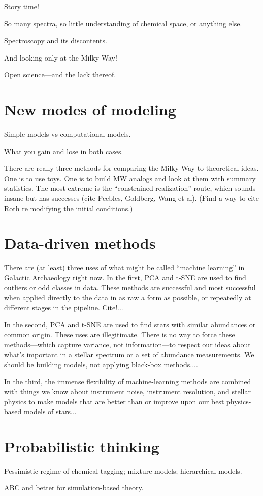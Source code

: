 \documentclass[11pt, letterpaper]{article}
\begin{document}
Story time!

So many spectra, so little understanding of chemical space, or anything else.

Spectroscopy and its discontents.

And looking only at the Milky Way!

Open science---and the lack thereof.

\section{New modes of modeling}

Simple models vs computational models.

What you gain and lose in both cases.

There are really three methods for comparing the Milky Way to
theoretical ideas. One is to use toys. One is to build MW analogs and
look at them with summary statistics. The most extreme is the
``constrained realization'' route, which sounds insane but has
successes (cite Peebles, Goldberg, Wang et al).  (Find a way to cite
Roth re modifying the initial conditions.)

\section{Data-driven methods}

There are (at least) three uses of what might be called ``machine learning''
in Galactic Archaeology right now. In the first, PCA and t-SNE are used to
find outliers or odd classes in data. These methods are successful and most
successful when applied directly to the data in as raw a form as possible, or
repeatedly at different stages in the pipeline. Cite!...

In the second, PCA and t-SNE are used to find stars with similar
abundances or common origin. These uses are illegitimate. There is no
way to force these methods---which capture variance, not
information---to respect our ideas about what's important in a stellar
spectrum or a set of abundance measurements. We should be building
models, not applying black-box methods....

In the third, the immense flexibility of machine-learning methods are
combined with things we know about instrument noise, instrument
resolution, and stellar physics to make models that are better than or
improve upon our best physics-based models of stars...

\section{Probabilistic thinking}

Pessimistic regime of chemical tagging; mixture models; hierarchical models.

ABC and better for simulation-based theory.
\end{document}
